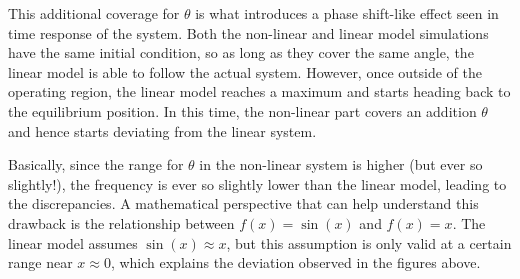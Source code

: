 \documentclass[10pt]{article}
\begin{document}
    This additional coverage for $\theta$ is what introduces a phase shift-like  effect seen in time response of the system. Both the non-linear and linear model simulations have the same initial condition, so as long as they cover the same angle, the linear model is able to follow the actual system. However, once outside of the operating region, the linear model reaches a maximum and starts heading back to the equilibrium position. In this time, the non-linear part covers an addition $\theta$ and hence starts deviating from the linear system. 
    
    Basically, since the range for $\theta$ in the non-linear system is higher (but ever so slightly!), the frequency is ever so slightly lower than the linear model, leading to the discrepancies. A mathematical perspective that can help understand this drawback is the relationship between $f(x) = \sin(x)$ and $f(x) = x$. The linear model assumes $\sin(x) \approx x$, but this assumption is only valid at a certain range near $x \approx 0$, which explains the deviation observed in the figures above. 
    
\end{document}
